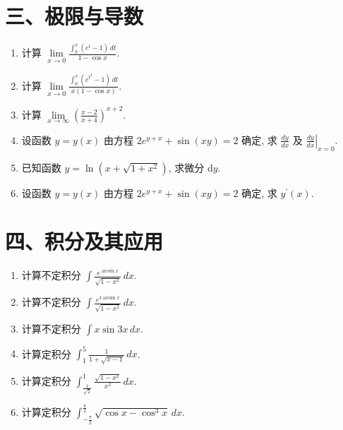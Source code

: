 
\section*{三、极限与导数}

\begin{enumerate}
    \item 计算 $\lim\limits_{x \to 0} \frac{\int_{0}^{x}\left(e^{t}-1\right) \,dt}{1-\cos x}$.
    
    \item 计算 $\lim\limits_{x \to 0} \frac{\int_{0}^{x}\left(e^{t^{2}}-1\right) \,dt}{x(1-\cos x)}$.
    
    \item 计算 $\lim\limits_{x \to \infty}\left(\frac{x-2}{x+4}\right)^{x+2}$.
    
    \item 设函数 $y=y(x)$ 由方程 $2 e^{y+x}+\sin (x y)=2$ 确定, 求 $\frac{d y}{d x}$ 及 $\left.\frac{d y}{d x}\right|_{x=0}$.
    
    \item 已知函数 $y=\ln \left(x+\sqrt{1+x^{2}}\right)$, 求微分 $\mathrm{d} y$.
    
    \item 设函数 $y=y(x)$ 由方程 $2 e^{y+x}+\sin (x y)=2$ 确定, 求 $y^{\prime}(x)$.
\end{enumerate}

\section*{四、积分及其应用}

\begin{enumerate}
    \item 计算不定积分 $\int \frac{e^{\arcsin x}}{\sqrt{1-x^{2}}} \,dx$.
    
    \item 计算不定积分 $\int \frac{e^{3 \arcsin x}}{\sqrt{1-x^{2}}} \,dx$.
    
    \item 计算不定积分 $\int x \sin 3 x \,dx$.
    
    \item 计算定积分 $\int_{1}^{5} \frac{1}{1+\sqrt{x-1}} \,dx$.
    
    \item 计算定积分 $\int_{\frac{1}{\sqrt{2}}}^{1} \frac{\sqrt{1-x^{2}}}{x^{2}} \,dx$.
    
    \item 计算定积分 $\int_{-\frac{\pi}{2}}^{\frac{\pi}{2}} \sqrt{\cos x-\cos^{3} x} \,dx$.
\end{enumerate}


